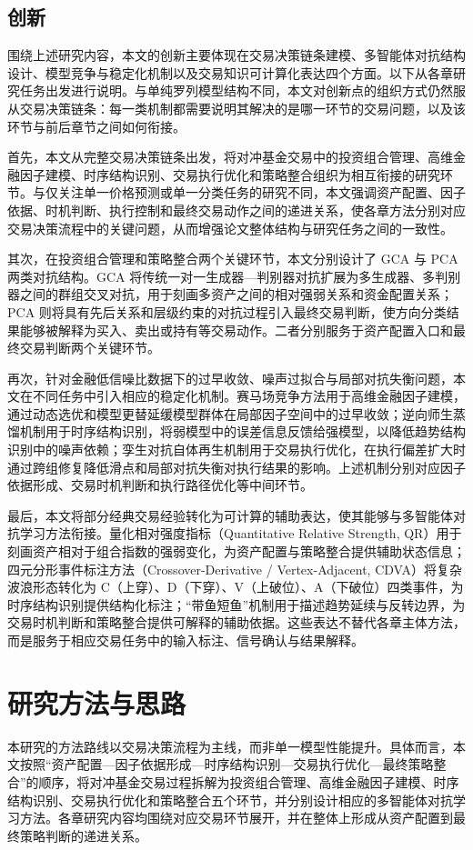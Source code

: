\subsection{创新}
围绕上述研究内容，本文的创新主要体现在交易决策链条建模、多智能体对抗结构设计、模型竞争与稳定化机制以及交易知识可计算化表达四个方面。以下从各章研究任务出发进行说明。与单纯罗列模型结构不同，本文对创新点的组织方式仍然服从交易决策链条：每一类机制都需要说明其解决的是哪一环节的交易问题，以及该环节与前后章节之间如何衔接。

首先，本文从完整交易决策链条出发，将对冲基金交易中的投资组合管理、高维金融因子建模、时序结构识别、交易执行优化和策略整合组织为相互衔接的研究环节。与仅关注单一价格预测或单一分类任务的研究不同，本文强调资产配置、因子依据、时机判断、执行控制和最终交易动作之间的递进关系，使各章方法分别对应交易决策流程中的关键问题，从而增强论文整体结构与研究任务之间的一致性。

其次，在投资组合管理和策略整合两个关键环节，本文分别设计了 GCA 与 PCA 两类对抗结构。GCA 将传统一对一生成器—判别器对抗扩展为多生成器、多判别器之间的群组交叉对抗，用于刻画多资产之间的相对强弱关系和资金配置关系；PCA 则将具有先后关系和层级约束的对抗过程引入最终交易判断，使方向分类结果能够被解释为买入、卖出或持有等交易动作。二者分别服务于资产配置入口和最终交易判断两个关键环节。

再次，针对金融低信噪比数据下的过早收敛、噪声过拟合与局部对抗失衡问题，本文在不同任务中引入相应的稳定化机制。赛马场竞争方法用于高维金融因子建模，通过动态选优和模型更替延缓模型群体在局部因子空间中的过早收敛；逆向师生蒸馏机制用于时序结构识别，将弱模型中的误差信息反馈给强模型，以降低趋势结构识别中的噪声依赖；孪生对抗自体再生机制用于交易执行优化，在执行偏差扩大时通过跨组修复降低滑点和局部对抗失衡对执行结果的影响。上述机制分别对应因子依据形成、交易时机判断和执行路径优化等中间环节。

最后，本文将部分经典交易经验转化为可计算的辅助表达，使其能够与多智能体对抗学习方法衔接。量化相对强度指标（Quantitative Relative Strength, QR）用于刻画资产相对于组合指数的强弱变化，为资产配置与策略整合提供辅助状态信息；四元分形事件标注方法（Crossover-Derivative / Vertex-Adjacent, CDVA）将复杂波浪形态转化为 C（上穿）、D（下穿）、V（上破位）、A（下破位）四类事件，为时序结构识别提供结构化标注；“带鱼短鱼”机制用于描述趋势延续与反转边界，为交易时机判断和策略整合提供可解释的辅助依据。这些表达不替代各章主体方法，而是服务于相应交易任务中的输入标注、信号确认与结果解释。

\section{研究方法与思路}
本研究的方法路线以交易决策流程为主线，而非单一模型性能提升。具体而言，本文按照“资产配置—因子依据形成—时序结构识别—交易执行优化—最终策略整合”的顺序，将对冲基金交易过程拆解为投资组合管理、高维金融因子建模、时序结构识别、交易执行优化和策略整合五个环节，并分别设计相应的多智能体对抗学习方法。各章研究内容均围绕对应交易环节展开，并在整体上形成从资产配置到最终策略判断的递进关系。

